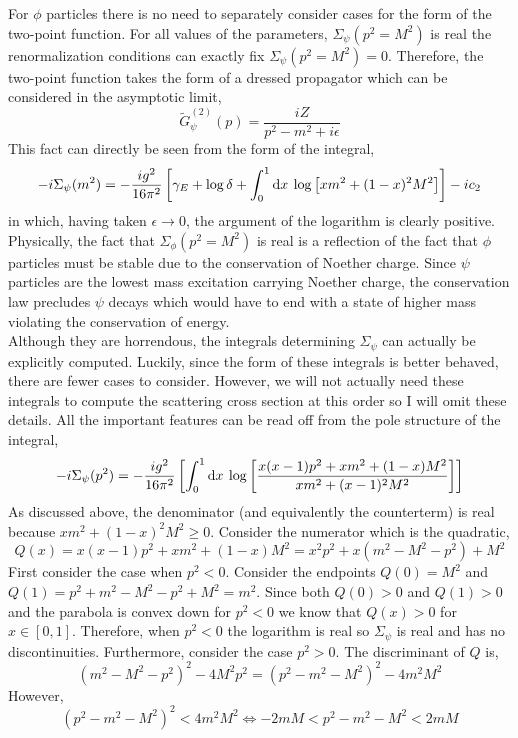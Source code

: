 \documentclass{article}
\begin{document}
For $\phi$ particles there is no need to separately consider cases for the form of the two-point function. For all values of the parameters, $\Sigma_\psi(p^2 = M^2)$ is real the renormalization conditions can exactly fix $\Sigma_\psi(p^2 = M^2) = 0$. Therefore, the two-point function takes the form of a dressed propagator which can be considered in the asymptotic limit,
\[ \tilde{G}_\psi^{(2)}(p) = \frac{i Z}{p^2 - m^2 + i \epsilon} \]
This fact can directly be seen from the form of the integral, 
\[ - i \Sigma_\psi(m^2) = -\frac{ig^2}{16 \pi^2} \left[ \gamma_E + \log{\delta} + \int_{0}^{1} \mathrm{d}x \: \log{\left[ x m^2 + (1 - x)^2 M^2 \right]} \right] - i c_2 \]
in which, having taken $\epsilon \to 0$, the argument of the logarithm is clearly positive. Physically, the fact that $\Sigma_\phi(p^2 = M^2)$ is real is a reflection of the fact that $\phi$ particles must be stable due to the conservation of Noether charge. Since $\psi$ particles are the lowest mass excitation carrying Noether charge, the conservation law precludes $\psi$ decays which would have to end with a state of higher mass violating the conservation of energy. \bigskip\\
Although they are horrendous, the integrals determining $\Sigma_\psi$ can actually be explicitly computed. Luckily, since the form of these integrals is better behaved, there are fewer cases to consider. However, we will not actually need these integrals to compute the scattering cross section at this order so I will omit these details. All the important features can be read off from the pole structure of the integral,
\[ - i \Sigma_\psi(p^2) = - \frac{ig^2}{16 \pi^2} \left[ \int_{0}^{1} \mathrm{d}x \: \log{\left[\frac{ x(x - 1) p^2 + x m^2 + (1 - x) M^2}{x m^2 + (x - 1)^2 M^2} \right]} \right] \]
As discussed above, the denominator (and equivalently the counterterm) is real because $x m^2 + (1 - x)^2 M^2 \ge 0$. Consider the numerator which is the quadratic,
\[Q(x) = x(x - 1) p^2 + x m^2 + (1-x)M^2 = x^2 p^2 + x (m^2 - M^2 - p^2) + M^2 \]
First consider the case when $p^2 < 0$. Consider the endpoints $Q(0) = M^2$ and $Q(1) = p^2 + m^2 - M^2 - p^2 + M^2 = m^2$. Since both $Q(0) > 0$ and $Q(1) > 0$ and the parabola is convex down for $p^2 < 0$ we know that $Q(x) > 0$ for $x \in [0,1]$. Therefore, when $p^2 < 0$ the logarithm is real so $\Sigma_\psi$ is real and has no discontinuities. Furthermore, consider the case $p^2 > 0$. The discriminant of $Q$ is,
\[ (m^2 - M^2 - p^2)^2 - 4 M^2 p^2 = (p^2 - m^2 - M^2)^2 - 4 m^2 M^2 \]
However, 
\[ (p^2 - m^2 - M^2)^2 < 4 m^2 M^2 \iff - 2 m M < p^2 - m^2 - M^2 < 2 m M\]
\end{document}
